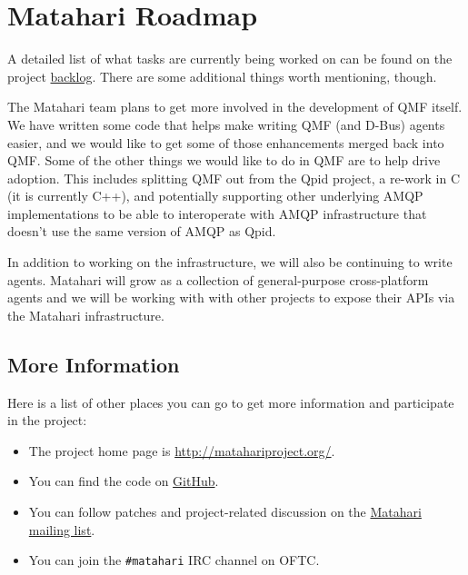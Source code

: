 \section{Matahari Roadmap}

A detailed list of what tasks are currently being worked on can be found on the project \href{https://github.com/matahari/matahari/wiki/Backlog}{backlog}.  There are some additional things worth mentioning, though.

The Matahari team plans to get more involved in the development of QMF itself.  We have written some code that helps make writing QMF (and D-Bus) agents easier, and we would like to get some of those enhancements merged back into QMF.  Some of the other things we would like to do in QMF are to help drive adoption.  This includes splitting QMF out from the Qpid project, a re-work in C (it is currently C++), and potentially supporting other underlying AMQP implementations to be able to interoperate with AMQP infrastructure that doesn't use the same version of AMQP as Qpid.

In addition to working on the infrastructure, we will also be continuing to write agents.  Matahari will grow as a collection of general-purpose cross-platform agents and we will be working with with other projects to expose their APIs via the Matahari infrastructure.

\subsection{More Information}

Here is a list of other places you can go to get more information and participate in the project:

\begin{itemize}
\item The project home page is \url{http://matahariproject.org/}.
\item You can find the code on \href{https://github.com/matahari/matahari}{GitHub}.
\item You can follow patches and project-related discussion on the \href{https://fedorahosted.org/mailman/listinfo/matahari}{Matahari mailing list}. 
\item You can join the \texttt{\#matahari} IRC channel on OFTC.
\end{itemize}
